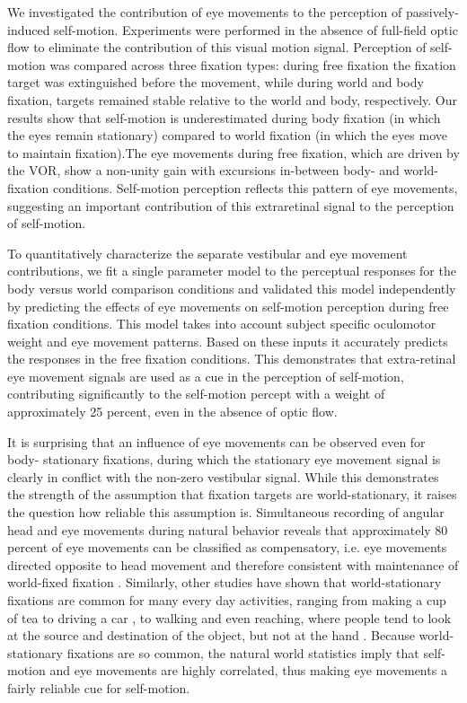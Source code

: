 We investigated the contribution of eye movements to the perception of passively-induced self-motion. Experiments were performed in the absence of full-field optic flow to eliminate the contribution of this visual motion signal. Perception of self-motion was compared across three fixation types: during free fixation the fixation target was extinguished before the movement, while during world and body fixation, targets  remained stable relative to the world and body, respectively. Our results show that self-motion is underestimated during body fixation (in which the eyes remain stationary) compared to world fixation (in which the eyes move to maintain fixation).The eye movements during free fixation, which  are driven by the VOR, show a non-unity gain with excursions in-between body- and world-fixation conditions. Self-motion perception reflects this pattern of eye movements, suggesting an important contribution of this extraretinal signal to the perception of self-motion.

 To quantitatively characterize the separate vestibular and eye movement contributions, we fit a single parameter model to the perceptual responses for the body versus world comparison conditions and validated this model independently by predicting the effects of eye movements on self-motion perception during free fixation conditions. This model takes into account subject specific oculomotor weight and eye movement patterns. Based on these inputs it accurately predicts the responses in the free fixation conditions. This demonstrates that extra-retinal eye movement signals are used as a cue in the perception of self-motion, contributing significantly to the self-motion percept with a weight of approximately 25 percent, even in the absence of optic flow.
 
It is surprising that an influence of eye movements can be observed even for body- stationary fixations, during which the stationary eye movement signal is clearly in conflict with the non-zero vestibular signal. While this demonstrates the strength of the assumption that fixation targets are world-stationary, it raises the question how reliable this assumption is. Simultaneous recording of angular head and eye movements during natural behavior reveals that approximately 80 percent of eye movements can be classified as compensatory, i.e. eye movements directed opposite to head movement and therefore consistent with maintenance of world-fixed fixation \cite{einhauser2007}. Similarly, other studies have shown that world-stationary fixations are common for many every day activities, ranging from making a cup of tea \cite{hayhoe2014} to driving a car \cite{land1994}, to walking \cite{foulsham2011} and even reaching, where people tend to look at the source and destination of the object, but not at the hand \cite{flanagan2003}. Because world-stationary fixations are so common, the natural world statistics imply that self-motion and eye movements are highly correlated, thus making eye movements a fairly reliable cue for self-motion.


